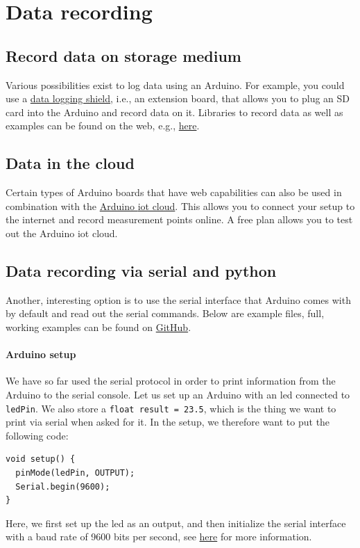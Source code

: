\section{Data recording}

\subsection{Record data on storage medium}

Various possibilities exist to log data using an Arduino. For example, you could use a \href{https://www.arrow.com/en/products/1141/adafruit-industries}{data logging shield}, i.e., an extension board, that allows you to plug an SD card into the Arduino and record data on it. Libraries to record data as well as examples can be found on the web, e.g., \href{https://www.arrow.com/en/research-and-events/articles/data-logging-with-arduino-tutorial}{here}.

\subsection{Data in the cloud}

Certain types of Arduino boards that have web capabilities can also be used in combination with the \href{https://docs.arduino.cc/cloud/iot-cloud}{Arduino \ac{iot} cloud}. This allows you to connect your setup to the internet and record measurement points online. A free plan allows you to test out the Arduino \ac{iot} cloud. 

\subsection{Data recording via serial and python}

Another, interesting option is to use the serial interface that Arduino comes with by default and read out the serial commands. Below are example files, full, working examples can be found on \href{https://github.com/galactic-forensics/workshop_arduino_electronics/tree/main/further_examples/data_logger}{GitHub}. 

\paragraph{Arduino setup} We have so far used the serial protocol in order to print information from the Arduino to the serial console. Let us set up an Arduino with an \ac{led} connected to \lstinline{ledPin}. We also store a \lstinline{float result = 23.5}, which is the thing we want to print via serial when asked for it. In the setup, we therefore want to put the following code:
\begin{lstlisting}
void setup() {
  pinMode(ledPin, OUTPUT);
  Serial.begin(9600);
}
\end{lstlisting}
Here, we first set up the \ac{led} as an output, and then initialize the serial interface with a baud rate of 9600 bits per second, see \href{https://www.arduino.cc/en/Serial.Begin}{here} for more information.

